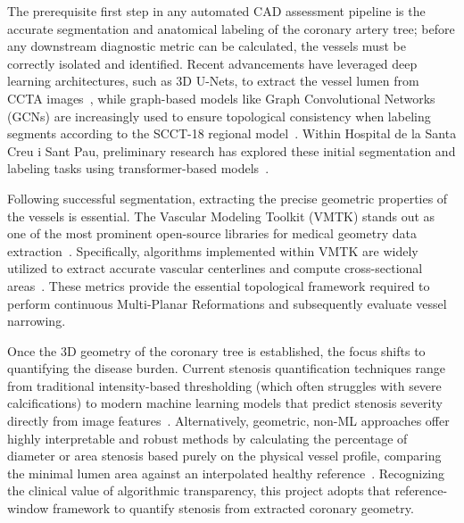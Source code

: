 The prerequisite first step in any automated CAD assessment pipeline is the accurate segmentation and anatomical labeling of the coronary artery tree; before any downstream diagnostic metric can be calculated, the vessels must be correctly isolated and identified. Recent advancements have leveraged deep learning architectures, such as 3D U-Nets, to extract the vessel lumen from CCTA images~\cite{cicek2016}, while graph-based models like Graph Convolutional Networks (GCNs) are increasingly used to ensure topological consistency when labeling segments according to the SCCT-18 regional model~\cite{yang2020,leipsic2014}. Within Hospital de la Santa Creu i Sant Pau, preliminary research has explored these initial segmentation and labeling tasks using transformer-based models~\cite{clapers2025,sanchez2022}.

Following successful segmentation, extracting the precise geometric properties of the vessels is essential. The Vascular Modeling Toolkit (VMTK) stands out as one of the most prominent open-source libraries for medical geometry data extraction~\cite{izzo2018}. Specifically, algorithms implemented within VMTK are widely utilized to extract accurate vascular centerlines and compute cross-sectional areas~\cite{piccinelli2009,izzo2018}. These metrics provide the essential topological framework required to perform continuous Multi-Planar Reformations and subsequently evaluate vessel narrowing.

Once the 3D geometry of the coronary tree is established, the focus shifts to quantifying the disease burden. Current stenosis quantification techniques range from traditional intensity-based thresholding (which often struggles with severe calcifications) to modern machine learning models that predict stenosis severity directly from image features~\cite{zhang2024,hong2019}. Alternatively, geometric, non-ML approaches offer highly interpretable and robust methods by calculating the percentage of diameter or area stenosis based purely on the physical vessel profile, comparing the minimal lumen area against an interpolated healthy reference~\cite{hideo_kajita2019}. Recognizing the clinical value of algorithmic transparency, this project adopts that reference-window framework to quantify stenosis from extracted coronary geometry.


